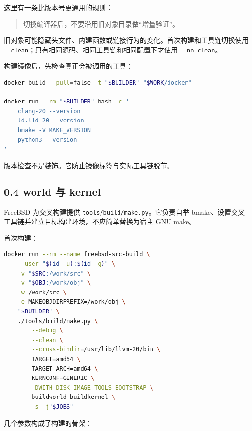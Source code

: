 \documentclass[
  11pt,
  UTF8,
  a4paper,
  fontset=fandol]{ctexart}
\newcommand{\passthrough}[1]{#1}
\begin{document}
这里有一条比版本号更通用的规则：

\begin{quote}
切换编译器后，不要沿用旧对象目录做``增量验证''。
\end{quote}

旧对象可能隐藏头文件、内建函数或链接行为的变化。首次构建和工具链切换使用
\passthrough{\lstinline!--clean!}；只有相同源码、相同工具链和相同配置下才使用
\passthrough{\lstinline!--no-clean!}。

构建镜像后，先检查真正会被调用的工具：

\begin{lstlisting}[language=sh]
docker build --pull=false -t "$BUILDER" "$WORK/docker"

docker run --rm "$BUILDER" bash -c '
    clang-20 --version
    ld.lld-20 --version
    bmake -V MAKE_VERSION
    python3 --version
'
\end{lstlisting}

版本检查不是装饰。它防止镜像标签与实际工具链脱节。

\subsection{0.4 world 与 kernel}\label{world-ux4e0e-kernel}

FreeBSD 为交叉构建提供
\passthrough{\lstinline!tools/build/make.py!}。它负责自举
bmake、设置交叉工具链并建立目标构建环境，不应简单替换为宿主 GNU make。

首次构建：

\begin{lstlisting}[language=sh]
docker run --rm --name freebsd-src-build \
    --user "$(id -u):$(id -g)" \
    -v "$SRC:/work/src" \
    -v "$OBJ:/work/obj" \
    -w /work/src \
    -e MAKEOBJDIRPREFIX=/work/obj \
    "$BUILDER" \
    ./tools/build/make.py \
        --debug \
        --clean \
        --cross-bindir=/usr/lib/llvm-20/bin \
        TARGET=amd64 \
        TARGET_ARCH=amd64 \
        KERNCONF=GENERIC \
        -DWITH_DISK_IMAGE_TOOLS_BOOTSTRAP \
        buildworld buildkernel \
        -s -j"$JOBS"
\end{lstlisting}

几个参数构成了构建的骨架：
\end{document}
